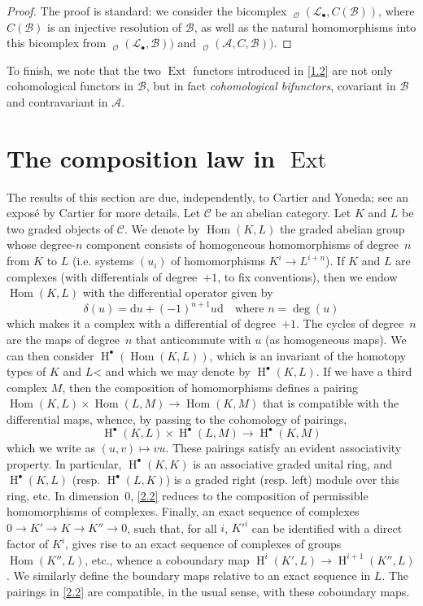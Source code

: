 \documentclass{article}
\theoremstyle{plain}
\theoremstyle{definition}
\newcommand{\sh}{\mathscr}
\newcommand{\cat}{\mathcal}
\DeclareMathOperator{\Ext}{Ext}
\DeclareMathOperator{\Hom}{Hom}
\DeclareMathOperator{\shHom}{\underline{Hom}}
\DeclareMathOperator{\HH}{H}
\newcommand{\oldpage}[1]{\marginpar{\footnotesize$\Big\vert$ \textit{p.~#1}}}
\begin{document}
\begin{proof}
  The proof is standard: we consider the bicomplex $\shHom_\sh{O}(\sh{L}_\bullet,C(\sh{B}))$, where $C(\sh{B})$ is an injective resolution of $\sh{B}$, as well as the natural homomorphisms into this bicomplex from $\shHom_\sh{O}(\sh{L}_\bullet,\sh{B}))$ and $\shHom_\sh{O}(\sh{A},C,\sh{B}))$.
\end{proof}

To finish, we note that the two $\Ext$ functors introduced in \cref{1.2} are not only cohomological functors in $\sh{B}$, but in fact \emph{cohomological bifunctors}, covariant in $\sh{B}$ and contravariant in $\sh{A}$.


\section{The composition law in \texorpdfstring{$\Ext$}{Ext}}
\label{section2}

The results of this section are due, independently, to Cartier and Yoneda;
see an expos\'{e} by Cartier \cite{1} for more details.
Let $\cat{C}$ be an abelian category.
Let $K$ and $L$ be two graded objects of $\cat{C}$.
We denote by $\Hom(K,L)$ the graded abelian group whose degree-$n$ component consists of homogeneous homomorphisms of degree~$n$ from $K$ to $L$ (i.e. systems $(u_i)$ of homomorphisms $K^i\to L^{i+n}$).
If $K$ and $L$ are complexes (with differentials of degree~$+1$, to fix conventions), then we endow $\Hom(K,L)$ with the differential operator given by
\[
\label{2.1}
  \delta(u) = \mathrm{d}u + (-1)^{n+1}u\mathrm{d}
  \quad\text{where }n=\deg(u)
\tag{2.1}
\]
which makes it a complex with a differential of degree~$+1$.
The cycles of degree~$n$ are the maps of degree~$n$ that anticommute with $u$ (as homogeneous maps).
We can then consider $\HH^\bullet(\Hom(K,L))$, which is an invariant of the homotopy types of $K$ and $L$< and which we may denote by $\HH^\bullet(K,L)$.
If we have a third complex $M$, then the composition of homomorphisms defines a pairing $\Hom(K,L)\times\Hom(L,M)\to\Hom(K,M)$ that is compatible with the differential maps, whence, by passing to the cohomology of pairings,
\[
\label{2.2}
  \HH^\bullet(K,L)\times\HH^\bullet(L,M) \to \HH^\bullet(K,M)
\tag{2.2}
\]
which we write as $(u,v)\mapsto vu$.
These pairings satisfy an evident associativity property.
In particular, $\HH^\bullet(K,K)$ is an associative graded unital ring, and $\HH^\bullet(K,L)$ (resp. $\HH^\bullet(L,K)$) is a graded right (resp. left) module over this ring, etc.
In dimension~$0$, \cref{2.2} reduces to the composition of permissible homomorphisms of complexes.
Finally, an exact sequence of complexes
\oldpage{149-04}
$0\to K'\to K\to K''\to0$, such that, for all $i$, $K'^i$ can be identified with a direct factor of $K^i$, gives rise to an exact sequence of complexes of groups $\Hom(K'',L)$, etc., whence a coboundary map $\HH^i(K',L)\to\HH^{i+1}(K'',L)$.
We similarly define the boundary maps relative to an exact sequence in $L$.
The pairings in \cref{2.2} are compatible, in the usual sense, with these coboundary maps.
\end{document}
